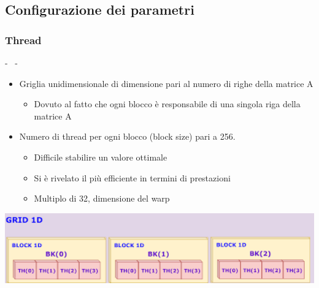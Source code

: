 \documentclass[compress]{beamer}
\begin{document}
\subsection{Configurazione dei parametri}
\subsubsection*{Thread}
\begin{frame}{\secname \text{ }- \subsecname\ \text{ }- \subsubsecname}
    \begin{itemize}
        \item Griglia unidimensionale di dimensione pari al numero di righe della matrice A
        \begin{itemize}
            \item Dovuto al fatto che ogni blocco è responsabile di una singola riga della matrice A
        \end{itemize}
        \item Numero di thread per ogni blocco (block size) pari a 256.
        \begin{itemize}
            \item Difficile stabilire un valore ottimale
            \item Si è rivelato il più efficiente in termini di prestazioni
            \item Multiplo di 32, dimensione del warp
        \end{itemize}
    \end{itemize}
    \begin{minipage}{0.4\textwidth}
        \centering
        \begin{adjustbox}{margin=6cm 0.3cm 0cm 0.3cm, center} %
            \includegraphics[width=1.1\textwidth, frame]{resources/grid1d.png}
        \end{adjustbox}
    \end{minipage}
\end{frame}
\end{document}
